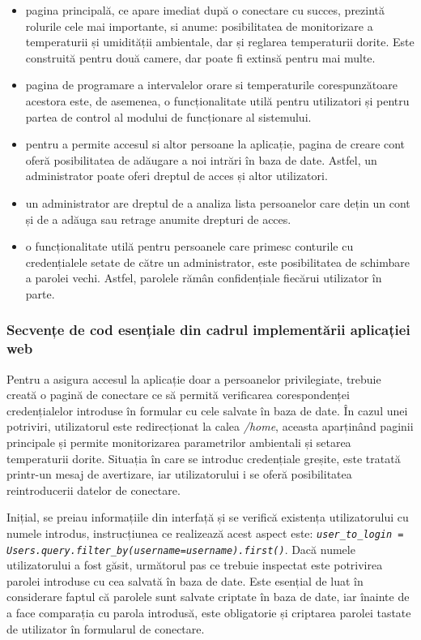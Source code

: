 \begin{itemize}
\setlength{\itemindent}{2em}
	\itemsep0em
	\item pagina principală, ce apare imediat după o conectare cu succes, prezintă rolurile cele mai importante, si anume: posibilitatea de monitorizare a temperaturii și umidității ambientale, dar și reglarea temperaturii dorite. Este construită pentru două camere, dar poate fi extinsă pentru mai multe.
	\item pagina de programare a intervalelor orare si temperaturile corespunzătoare acestora este, de asemenea, o funcționalitate utilă pentru utilizatori și pentru partea de control al modului de funcționare al sistemului.
	\item pentru a permite accesul si altor persoane la aplicație, pagina de creare cont oferă posibilitatea de adăugare a noi intrări în baza de date. Astfel, un administrator poate oferi dreptul de acces și altor utilizatori. 
	\item un administrator are dreptul de a analiza lista persoanelor care dețin un cont și de a adăuga sau retrage anumite drepturi de acces.
	\item o funcționalitate utilă pentru persoanele care primesc conturile cu credențialele setate de către un administrator, este posibilitatea de schimbare a parolei vechi. Astfel, parolele rămân confidențiale fiecărui utilizator în parte.
\end{itemize}
	
\subsubsection{Secvențe de cod esențiale din cadrul implementării aplicației web}

	Pentru a asigura accesul la aplicație doar a persoanelor privilegiate, trebuie creată o pagină de conectare ce să permită verificarea corespondenței credențialelor introduse în formular cu cele salvate în baza de date. În cazul unei potriviri, utilizatorul este redirecționat la calea \textit{/home}, aceasta aparținând paginii principale și permite monitorizarea parametrilor ambientali și setarea  temperaturii dorite. Situația în care se introduc credențiale greșite, este tratată printr-un mesaj de avertizare, iar utilizatorului i se oferă posibilitatea reintroducerii datelor de conectare.

	Inițial, se preiau informațiile din interfață și se verifică existența utilizatorului cu numele introdus, instrucțiunea ce realizează acest aspect este: \textit{\texttt{user\_to\_login = Users.query.filter\_by(username=username).first()}}. Dacă numele utilizatorului a fost găsit, următorul pas ce trebuie inspectat este potrivirea parolei introduse cu cea salvată în baza de date. Este esențial de luat în considerare faptul că parolele sunt salvate criptate în baza de date, iar înainte de a face comparația cu parola introdusă, este obligatorie și criptarea parolei tastate de utilizator în formularul de conectare. 

